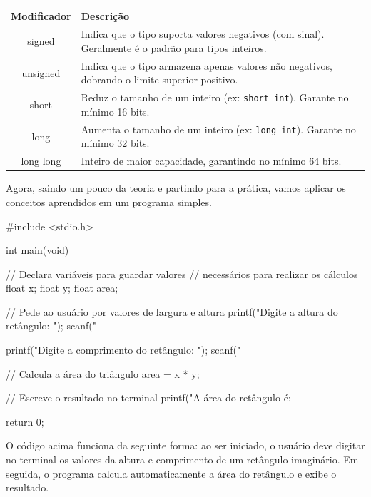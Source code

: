 \begin{center}
    \begin{tabular}{|c|p{11cm}|}
        \hline
        \textbf{Modificador} & \textbf{Descrição} \\
        \hline
        signed & Indica que o tipo suporta valores negativos (com sinal). Geralmente é o padrão para tipos inteiros. \\
        \hline
        unsigned & Indica que o tipo armazena apenas valores não negativos, dobrando o limite superior positivo. \\
        \hline
        short & Reduz o tamanho de um inteiro (ex: \texttt{short int}). Garante no mínimo 16 bits. \\
        \hline
        long & Aumenta o tamanho de um inteiro (ex: \texttt{long int}). Garante no mínimo 32 bits. \\
        \hline
        long long & Inteiro de maior capacidade, garantindo no mínimo 64 bits. \\
        \hline
    \end{tabular}
\end{center}

\clearpage

Agora, saindo um pouco da teoria e partindo para a prática, vamos aplicar os 
conceitos aprendidos em um programa simples.

\begin{excode}
    #include <stdio.h>

    int main(void) {
        // Declara variáveis para guardar valores
        // necessários para realizar os cálculos
        float x;
        float y;
        float area;

        // Pede ao usuário por valores de largura e altura
        printf("Digite a altura do retângulo: ");
        scanf("%

        printf("Digite a comprimento do retângulo: ");
        scanf("%

        // Calcula a área do triângulo
        area = x * y;

        // Escreve o resultado no terminal
        printf("A área do retângulo é: %

        return 0;
    }
\end{excode}

O código acima funciona da seguinte forma: ao ser iniciado, o usuário deve 
digitar no terminal os valores da altura e comprimento de um retângulo 
imaginário. Em seguida, o programa calcula automaticamente a área do 
retângulo e exibe o resultado.

